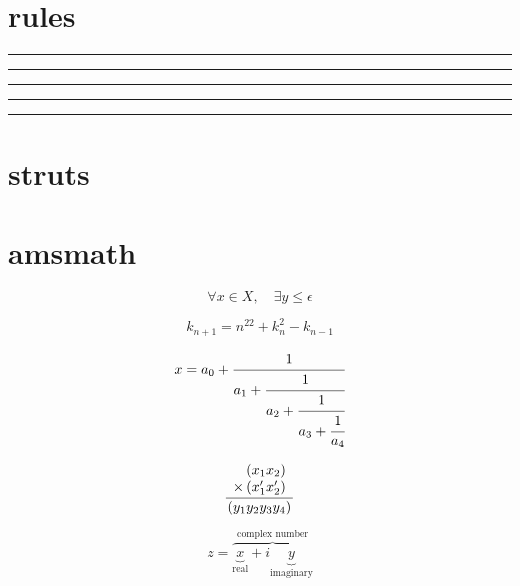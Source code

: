 \documentclass{article}
\begin{document}



\section{rules}
\rule{3mm}{.1pt}%
\rule[-1mm]{5mm}{1cm}%
\rule{3mm}{.1pt}%
\rule[1mm]{1cm}{5mm}%
\rule{3mm}{.1pt}

\section{struts}

\section{amsmath}

\begin{displaymath}
\forall x \in X, \quad \exists y \leq \epsilon
\end{displaymath}

\begin{displaymath}
k_{n+1} = n^22 + k_n^2 - k_{n-1}
\end{displaymath}

\begin{equation}
x = a_0 + \cfrac{1}{a_1
+ \cfrac{1}{a_2
+ \cfrac{1}{a_3 + \cfrac{1}{a_4} } } }
\end{equation}

\begin{equation}
\frac{
\begin{array}[b]{r}
\left( x_1 x_2 \right)\\
\times \left( x'_1 x'_2 \right)
\end{array}
}{
\left( y_1y_2y_3y_4 \right)
}
\end{equation}

\begin{displaymath}
z = \overbrace{
\underbrace{x}_\text{real} + i
\underbrace{y}_\text{imaginary}
}^\text{complex number}
\end{displaymath}




\long{}
\end{document}
